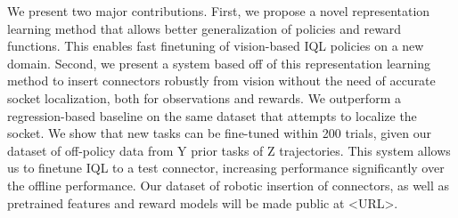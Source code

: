 We present two major contributions.
First, we propose a novel representation learning method that allows better generalization of policies and reward functions.
This enables fast finetuning of vision-based IQL policies on a new domain. 
Second, we present a system based off of this representation learning method to insert connectors robustly from vision without the need of accurate socket localization,
both for observations and rewards. We outperform a regression-based baseline on the same dataset that attempts to localize the socket.
We show that new tasks can be fine-tuned within 200 trials, given our dataset of off-policy data from Y prior tasks of Z trajectories.
This system allows us to finetune IQL to a test connector, increasing performance significantly over the offline performance.
Our dataset of robotic insertion of \numconnectors{} connectors, as well as pretrained features and reward models will be made public at <URL>.



